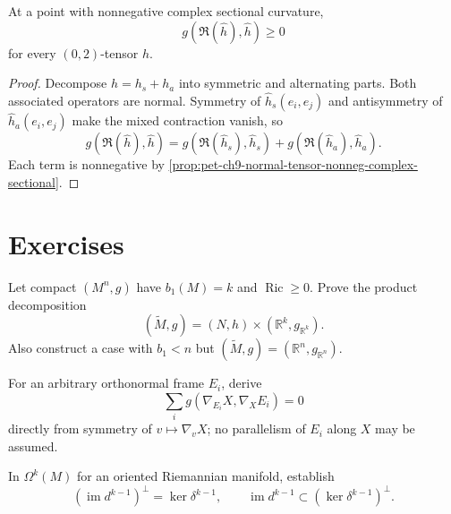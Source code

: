 \begin{proposition}
  \label{prop:pet-ch9-general-tensor-nonneg-complex-sectional}
  At a point with nonnegative complex sectional curvature,
  \[
    g(\mathfrak R(\hat h),\hat h)\ge0
  \]
  for every $(0,2)$-tensor $h$.
\end{proposition}
\begin{proof}
  \sketch
  Decompose \(h=h_s+h_a\) into symmetric and alternating parts.  Both
  associated operators are normal.  Symmetry of \(\hat h_s(e_i,e_j)\) and
  antisymmetry of \(\hat h_a(e_i,e_j)\) make the mixed contraction vanish, so
  \[
    g(\mathfrak R(\hat h),\hat h)
      =g(\mathfrak R(\hat h_s),\hat h_s)
       +g(\mathfrak R(\hat h_a),\hat h_a).
  \]
  Each term is nonnegative by
  \cref{prop:pet-ch9-normal-tensor-nonneg-complex-sectional}.
\end{proof}

\section{Exercises}

\begin{remark}
  \label{rem:pet-ch9-exercise-9-6-1}
  Let compact $(M^n,g)$ have $b_1(M)=k$ and $\operatorname{Ric}\ge0$.  Prove
  the product decomposition
  \[
    (\widetilde M,g)=(N,h)\times(\mathbb R^k,g_{\mathbb R^k}).
  \]
  Also construct a case with $b_1<n$ but
  $(\widetilde M,g)=(\mathbb R^n,g_{\mathbb R^n})$.
\end{remark}

\begin{remark}
  \label{rem:pet-ch9-exercise-9-6-2}
  For an arbitrary orthonormal frame $E_i$, derive
  \[
    \sum_i g(\nabla_{E_i}X,\nabla_XE_i)=0
  \]
  directly from symmetry of $v\mapsto\nabla_vX$; no parallelism of $E_i$
  along $X$ may be assumed.
\end{remark}

\begin{remark}
  \label{rem:pet-ch9-exercise-9-6-3}
  In $\Omega^k(M)$ for an oriented Riemannian manifold, establish
  \[
    (\operatorname{im}d^{k-1})^\perp=\ker\delta^{k-1},
    \qquad
    \operatorname{im}d^{k-1}\subset(\ker\delta^{k-1})^\perp.
  \]
\end{remark}


